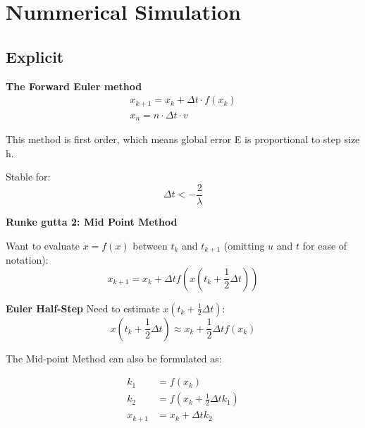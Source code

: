 \section{Nummerical Simulation}
\begin{figure}[H]
    \centering
    
\end{figure}
\newpage
\begin{figure}[H]
    \centering
    
\end{figure}
\newpage


\subsection{Explicit }

\textbf{The Forward Euler method}
\begin{subequations}
\begin{align}
    x_{k+1} = x_k + \Delta t \cdot f(x_k)\\
    x_n = n \cdot \Delta t \cdot v \label{eq:Euler}
\end{align}
\end{subequations}

This method is first order, which means global error E is proportional to step size h. 

Stable for: \[\Delta t < - \frac{2}{\lambda}\]

\textbf{Runke gutta 2: Mid Point Method }

Want to evaluate \(\dot{x} = f(x)\) between \(t_k\) and \(t_{k+1}\) (omitting \(u\) and \(t\) for ease of notation):
\begin{equation}
x_{k+1} = x_k + \Delta t f\left( x \left( t_k + \frac{1}{2} \Delta t \right) \right)
\end{equation}

\textbf{Euler Half-Step}
Need to estimate \(x \left( t_k + \frac{1}{2} \Delta t \right)\):
\begin{equation}
x \left( t_k + \frac{1}{2} \Delta t \right) \approx x_k + \frac{1}{2} \Delta t f(x_k)
\end{equation}

The Mid-point Method can also be formulated as:

\begin{align}
k_1 &= f(x_k) \\
k_2 &= f\left(x_k + \frac{1}{2} \Delta t k_1\right) \\
x_{k+1} &= x_k + \Delta t k_2
\end{align}

